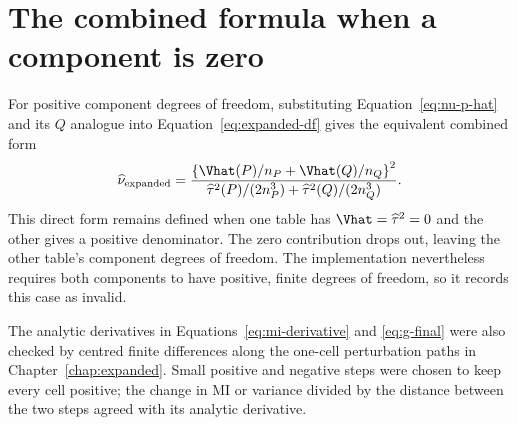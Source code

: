 \section{The combined formula when a component is zero}
\label{sec:zero-component}

For positive component degrees of freedom, substituting
Equation~\eqref{eq:nu-p-hat} and its \(Q\) analogue into
Equation~\eqref{eq:expanded-df} gives the equivalent combined form
\begin{equation}
  \widehat\nu_{\mathrm{expanded}}
  =
  \frac{
  \left\{\Vhat(P)/n_P+\Vhat(Q)/n_Q\right\}^2
  }{
  \widehat\tau^2(P)/(2n_P^3)
  +
  \widehat\tau^2(Q)/(2n_Q^3)
  }.
  \label{eq:expanded-df-direct}
\end{equation}
This direct form remains defined when one table has
\(\Vhat=\widehat\tau^2=0\) and the other gives a positive denominator.
The zero contribution drops out, leaving the other table's component degrees
of freedom. The implementation nevertheless requires both components to have
positive, finite degrees of freedom, so it records this case as invalid.

\medskip
{}

The analytic derivatives in Equations~\eqref{eq:mi-derivative} and
\eqref{eq:g-final} were also checked by centred finite differences along
the one-cell perturbation paths in Chapter~\ref{chap:expanded}. Small
positive and negative steps were chosen to keep every cell positive; the
change in MI or variance divided by the distance between the two steps
agreed with its analytic derivative.
